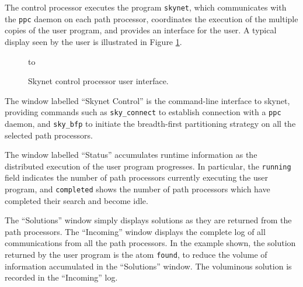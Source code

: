 The control processor executes the program \texttt{skynet}, which communicates
with the \texttt{ppc} daemon on each path processor, coordinates the execution
of the multiple copies of the user program, and provides an interface for
the user.  A typical display seen by the user is illustrated in 
Figure \ref{skynet_half_grey}.

\begin{figure}[htbp]
\vspace{5mm} \hbox to 
\caption{Skynet control processor user interface.}
\vspace{5mm}
\label{skynet_half_grey}
\end{figure}

The window labelled ``Skynet Control'' is the command-line interface to skynet,
providing commands such as \texttt{sky\_{}connect} to establish connection with a
\texttt{ppc} daemon, and \texttt{sky\_{}bfp} to initiate the breadth-first
partitioning strategy on all the selected path processors.

The window labelled ``Status'' accumulates runtime information as the
distributed execution of the user program progresses.  In particular, the
\texttt{running} field indicates the number of path processors currently 
executing the user program, and \texttt{completed} shows the number of
path processors which have completed their search and become idle.

The ``Solutions'' window simply displays solutions as they are returned from the
path processors.  The ``Incoming'' window displays the complete log of all communications
from all the path processors.  In the example shown, the solution returned by the
user program is the atom \texttt{found}, to reduce the volume of information
accumulated in the ``Solutions'' window.  The voluminous solution is recorded in
the ``Incoming'' log.

